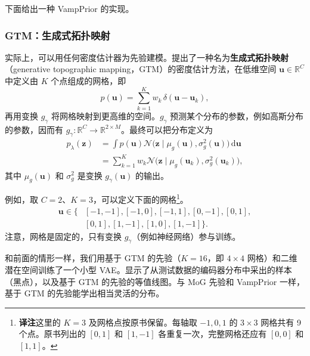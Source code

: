 
下面给出一种 VampPrior 的实现。

\subsubsection{GTM：生成式拓扑映射}
实际上，可以用任何密度估计器为先验建模。提出了一种名为\textbf{生成式拓扑映射}（generative topographic mapping，GTM）的密度估计方法，在低维空间 $\mathbf{u}\in\mathbb{R}^C$ 中定义由 $K$ 个点组成的网格，即
\begin{equation}
p(\mathbf{u})=\sum_{k=1}^{K} w_k\,\delta(\mathbf{u}-\mathbf{u}_k),
\tag{5.50}\label{eq:05-50}
\end{equation}
再用变换 $g_\gamma$ 将网格映射到更高维的空间。$g_\gamma$ 预测某个分布的参数，例如高斯分布的参数，因而有 $g_\gamma\colon\mathbb{R}^C\to\mathbb{R}^{2\times M}$。最终可以把分布定义为
\begin{align}
p_\lambda(\mathbf{z})
 &=\int p(\mathbf{u})\mathcal{N}\bigl(\mathbf{z}\mid\mu_g(\mathbf{u}),\sigma_g^2(\mathbf{u})\bigr)\,\mathrm{d}\mathbf{u}
 \tag{5.51}\label{eq:05-51}\\
 &=\sum_{k=1}^K w_k\mathcal{N}\bigl(\mathbf{z}\mid\mu_g(\mathbf{u}_k),\sigma_g^2(\mathbf{u}_k)\bigr),
 \tag{5.52}\label{eq:05-52}
\end{align}
其中 $\mu_g(\mathbf{u})$ 和 $\sigma_g^2$ 是变换 $g_\gamma(\mathbf{u})$ 的输出。

例如，取 $C=2$、$K=3$，可以定义下面的网格\footnote{\textbf{译注}\quad 这里的 $K=3$ 及网格点按原书保留。每轴取 $-1,0,1$ 的 $3\times3$ 网格共有 9 个点。原书列出的 $[0,1]$ 和 $[1,-1]$ 各重复一次，完整网格还应有 $[0,0]$ 和 $[1,1]$。}。
\[
\begin{aligned}
\mathbf{u}\in\{&[-1,-1],[-1,0],[-1,1],[0,-1],[0,1],\\
       &[0,1],[1,-1],[1,0],[1,-1]\}.
\end{aligned}
\]
注意，网格是固定的，只有变换 $g_\gamma$（例如神经网络）参与训练。

和前面的情形一样，我们用基于 GTM 的先验（$K=16$，即 $4\times4$ 网格）和二维潜在空间训练了一个小型 VAE。显示了从测试数据的编码器分布中采出的样本（黑点），以及基于 GTM 的先验的等值线图。与 MoG 先验和 VampPrior 一样，基于 GTM 的先验能学出相当灵活的分布。

